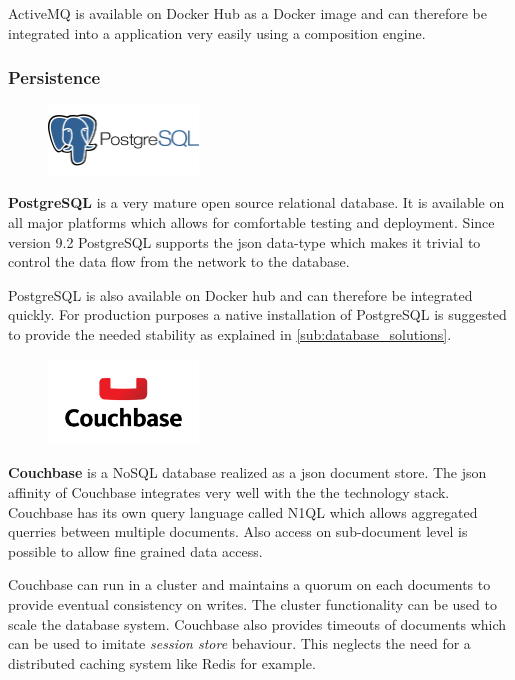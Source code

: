 ActiveMQ is available on Docker Hub as a Docker image and can therefore
be integrated into a \ms{} application very easily using a composition engine.


\subsubsection{Persistence}

\begin{figure}
 	\hspace*{0.4cm}
    \includegraphics[width=4cm]{images/dependencies/PostgreSQL}
\end{figure}

\textbf{PostgreSQL} is a very mature open source relational database. It is
available on all major platforms which allows for comfortable testing and
deployment. Since version 9.2 PostgreSQL supports the \gls{json} data-type which
makes it trivial to control the data flow from the network to the database.

PostgreSQL is also available on Docker hub and can therefore be integrated
quickly. For production purposes a native installation of PostgreSQL is
suggested to provide the needed stability as explained in
\autoref{sub:database_solutions}.\\ 


\begin{figure}
    \includegraphics[width=4cm]{images/dependencies/couchbase}
\end{figure}

\noindent \textbf{Couchbase} is a NoSQL database realized as a \gls{json}
document store. The \gls{json} affinity of Couchbase integrates very well with the the
technology stack. Couchbase has its own query language called N1QL which allows
aggregated querries between multiple documents. Also access on sub-document
level is possible to allow fine grained data access.

Couchbase can run in a cluster and maintains a quorum on each documents to
provide eventual consistency on writes. The cluster functionality can be used to
scale the database system. Couchbase also provides timeouts of documents which
can be used to imitate \textit{session store} behaviour. This neglects the need
for a distributed caching system like Redis for example.

